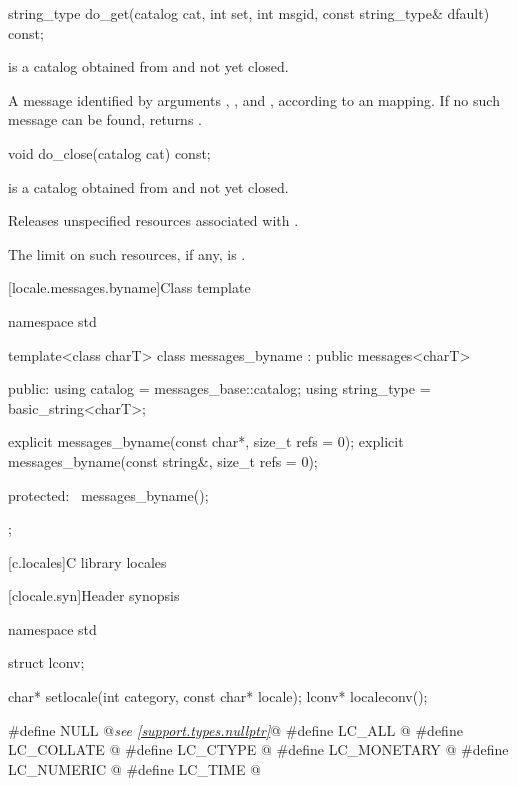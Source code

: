 %
\begin{itemdecl}
string_type do_get(catalog cat, int set, int msgid, const string_type& dfault) const;
\end{itemdecl}

\begin{itemdescr}
\pnum
\expects
{} is a catalog obtained from
and not yet closed.

\pnum
\returns
A message identified by arguments , , and , according
to an  mapping. If no
such message can be found, returns .
\end{itemdescr}

%
\begin{itemdecl}
void do_close(catalog cat) const;
\end{itemdecl}

\begin{itemdescr}
\pnum
\expects
{} is a catalog obtained from
and not yet closed.

\pnum
\effects
Releases unspecified resources associated with  .

\pnum
\remarks
The limit on such resources, if any, is .
\end{itemdescr}

[locale.messages.byname]{Class template }

%
\begin{codeblock}
namespace std {
  template<class charT>
    class messages_byname : public messages<charT> {
    public:
      using catalog     = messages_base::catalog;
      using string_type = basic_string<charT>;

      explicit messages_byname(const char*, size_t refs = 0);
      explicit messages_byname(const string&, size_t refs = 0);

    protected:
      ~messages_byname();
    };
}
\end{codeblock}

[c.locales]{C library locales}

[clocale.syn]{Header  synopsis}

%
%
%
%
%
%
%
%
%
%
\begin{codeblock}
namespace std {
  struct lconv;

  char* setlocale(int category, const char* locale);
  lconv* localeconv();
}

#define NULL @\textit{see \ref{support.types.nullptr}}@
#define LC_ALL @\seebelow@
#define LC_COLLATE @\seebelow@
#define LC_CTYPE @\seebelow@
#define LC_MONETARY @\seebelow@
#define LC_NUMERIC @\seebelow@
#define LC_TIME @\seebelow@
\end{codeblock}

